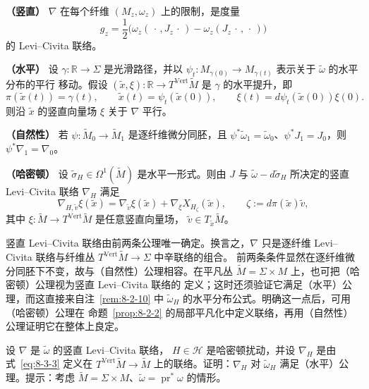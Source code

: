 \medskip
\noindent\textbf{（竖直）}\quad
$\nabla$ 在每个纤维 $(M_z,\omega_z)$ 上的限制，是度量
\[
  g_z=\frac12\bigl(\omega_z(\,\cdot\,,J_z\,\cdot\,)
    -\omega_z(J_z\,\cdot\,,\,\cdot\,)\bigr)
\]
的 Levi--Civita 联络。

\medskip
\noindent\textbf{（水平）}\quad
设 $\gamma:\mathbb R\to\Sigma$ 是光滑路径，并以
$\psi_t:M_{\gamma(0)}\to M_{\gamma(t)}$ 表示关于 $\widetilde\omega$ 的水平分布的平行
移动。假设 $(\widetilde x,\xi):\mathbb R\to T^{\mathrm{Vert}}\widetilde M$ 是
$\gamma$ 的水平提升，即
\[
  \pi(\widetilde x(t))=\gamma(t),\qquad
  \widetilde x(t)=\psi_t(\widetilde x(0)),\qquad
  \xi(t)=d\psi_t(\widetilde x(0))\xi(0).
\]
则沿 $\widetilde x$ 的竖直向量场 $\xi$ 关于 $\nabla$ 平行。

\medskip
\noindent\textbf{（自然性）}\quad
若 $\psi:\widetilde M_0\to\widetilde M_1$ 是逐纤维微分同胚，且
$\psi^*\widetilde\omega_1=\widetilde\omega_0$、$\psi^*J_1=J_0$，则
$\psi^*\nabla_1=\nabla_0$。

\medskip
\noindent\textbf{（哈密顿）}\quad
设 $\widetilde\sigma_H\in\Omega^1(\widetilde M)$ 是水平一形式。则由 $J$ 与
$\widetilde\omega-d\widetilde\sigma_H$ 所决定的竖直 Levi--Civita 联络 $\nabla_H$ 满足
\begin{equation}\label{eq:8-3-3}
  \nabla_{H,\widetilde v}\xi(\widetilde x)
  =\nabla_{\widetilde v}\xi(\widetilde x)
   +\nabla_\xi X_{H_\zeta}(\widetilde x),
  \qquad \zeta:=d\pi(\widetilde x)\widetilde v,
\end{equation}
其中 $\xi:\widetilde M\to T^{\mathrm{Vert}}\widetilde M$ 是任意竖直向量场，
$\widetilde v\in T_{\widetilde x}\widetilde M$。

竖直 Levi--Civita 联络由前两条公理唯一确定。换言之，$\nabla$ 只是逐纤维
Levi--Civita 联络与纤维丛 $T^{\mathrm{Vert}}\widetilde M\to\Sigma$ 中辛联络的组合。
前两条条件显然在逐纤维微分同胚下不变，故与（自然性）公理相容。在平凡丛
$\widetilde M=\Sigma\times M$ 上，也可把（哈密顿）公理视为竖直 Levi--Civita 联络的
定义；这时还须验证它满足（水平）公理，而这直接来自注~\ref{rem:8-2-10} 中
$\widetilde\omega_H$ 的水平分布公式。明确这一点后，可用（哈密顿）公理在
命题~\ref{prop:8-2-2} 的局部平凡化中定义联络，再用（自然性）公理证明它在整体上良定。

\begin{exercise}\label{ex:8-3-4}
设 $\nabla$ 是 $\widetilde\omega$ 的竖直 Levi--Civita 联络，
$H\in\mathcal H$ 是哈密顿扰动，并设 $\nabla_H$ 是由式~\eqref{eq:8-3-3} 定义在
$T^{\mathrm{Vert}}\widetilde M\to\widetilde M$ 上的联络。证明：$\nabla_H$ 对
$\widetilde\omega_H$ 满足（水平）公理。提示：考虑
$\widetilde M=\Sigma\times M$、$\widetilde\omega=\operatorname{pr}^*\omega$ 的情形。
\end{exercise}

